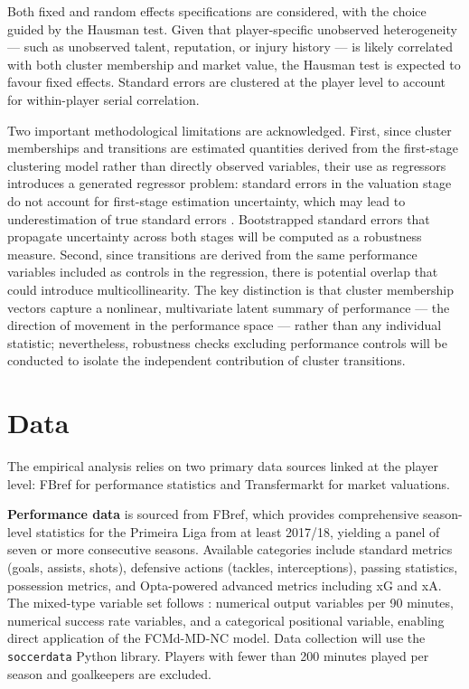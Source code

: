 \documentclass[a4paper,11pt]{report}
\begin{document}
Both fixed and random effects specifications are considered, with the choice guided by the Hausman test. Given that player-specific unobserved heterogeneity — such as unobserved talent, reputation, or injury history — is likely correlated with both cluster membership and market value, the Hausman test is expected to favour fixed effects. Standard errors are clustered at the player level to account for within-player serial correlation.

Two important methodological limitations are acknowledged. First, since cluster memberships and transitions are estimated quantities derived from the first-stage clustering model rather than directly observed variables, their use as regressors introduces a generated regressor problem: standard errors in the valuation stage do not account for first-stage estimation uncertainty, which may lead to underestimation of true standard errors \cite{pagan1984econometric}. Bootstrapped standard errors that propagate uncertainty across both stages will be computed as a robustness measure. Second, since transitions are derived from the same performance variables included as controls in the regression, there is potential overlap that could introduce multicollinearity. The key distinction is that cluster membership vectors capture a nonlinear, multivariate latent summary of performance — the direction of movement in the performance space — rather than any individual statistic; nevertheless, robustness checks excluding performance controls will be conducted to isolate the independent contribution of cluster transitions.

\chapter{Data}

The empirical analysis relies on two primary data sources linked at the player level: FBref for performance statistics and Transfermarkt for market valuations.

\textbf{Performance data} is sourced from FBref, which provides comprehensive season-level statistics for the Primeira Liga from at least 2017/18, yielding a panel of seven or more consecutive seasons. Available categories include standard metrics (goals, assists, shots), defensive actions (tackles, interceptions), passing statistics, possession metrics, and Opta-powered advanced metrics including xG and xA. The mixed-type variable set follows \cite{durso2022robust}: numerical output variables per 90 minutes, numerical success rate variables, and a categorical positional variable, enabling direct application of the FCMd-MD-NC model. Data collection will use the \texttt{soccerdata} Python library. Players with fewer than 200 minutes played per season and goalkeepers are excluded.
\end{document}
